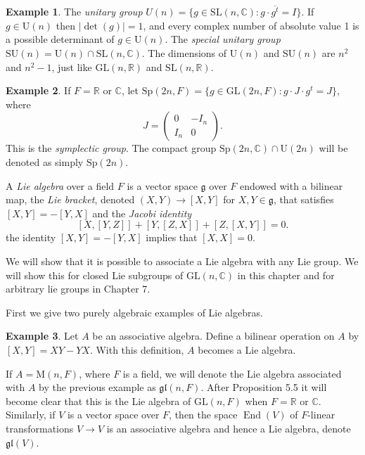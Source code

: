 \documentclass[12pt,reqno]{book}%
\theoremstyle{definition}
\newtheorem{example}{Example}[chapter]
\theoremstyle{remark}
\theoremstyle{theorem}
\theoremstyle{remark}
\DeclareMathOperator{\End}{End}
\begin{document}
\begin{example}\label{}
    The \emph{unitary group} $U(n) = \{g \in \mathrm{SL}(n, \mathbb{C}) : g \cdot \overline{g^t} = I\}$.
    If $g \in \mathrm{U}(n)$ then $|\det(g)| = 1$, and every complex number of absolute value 1 is a possible determinant of $g \in \mathrm{U}(n)$.
    The \emph{special unitary group} $\mathrm{SU}(n) = \mathrm{U}(n) \cap \mathrm{SL}(n, \mathbb{C})$.
    The dimensions of $\mathrm{U}(n)$ and $\mathrm{SU}(n)$ are $n^2$ and $n^2 - 1$, just like $\mathrm{GL}(n, \mathbb{R})$ and $\mathrm{SL}(n, \mathbb{R})$.
\end{example}

\begin{example}\label{}
    If $F = \mathbb{R}$ or $\mathbb{C}$, let $\mathrm{Sp}(2n, F) = \{g \in \mathrm{GL}(2n, F) : g \cdot J \cdot g^t = J\}$, where
    \[
        J = \begin{pmatrix}
            0   & -I_n  \\
            I_n & 0
        \end{pmatrix}
        .
    \]
    This is the \emph{symplectic group}.
    The compact group $\mathrm{Sp}(2n, \mathbb{C}) \cap \mathrm{U}(2n)$ will be denoted as simply $\mathrm{Sp}(2n)$.
\end{example}

A \emph{Lie algebra} over a field $F$ is a vector space $\mathfrak{g}$ over $F$ endowed with a bilinear map, the \emph{Lie bracket}, denoted $(X, Y) \to [X, Y]$ for $X, Y \in \mathfrak{g}$, that satisfies $[X, Y] = - [Y, X]$ and the \emph{Jacobi identity}
\begin{equation}\label{eqjacobiidentity}
    [X, [Y, Z]] + [Y, [Z, X]] + [Z, [X, Y]] = 0.
\end{equation}
the identity $[X, Y] = - [Y, X]$ implies that $[X, X] = 0$.

We will show that it is possible to associate a Lie algebra with any Lie group.
We will show this for closed Lie subgroups of $\mathrm{GL}(n, \mathbb{C})$ in this chapter and for arbitrary lie groups in Chapter 7.

First we give two purely algebraic examples of Lie algebras.

\begin{example}\label{}
    Let $A$ be an associative algebra.
    Define a bilinear operation on $A$ by $[X, Y] = XY - YX$.
    With this definition, $A$ becomes a Lie algebra.

    If $A = \mathrm{M}(n,F)$, where $F$ is a field, we will denote the Lie algebra associated with $A$ by the previous example as $\mathfrak{gl}(n,F)$.
    After Proposition 5.5 it will become clear that this is the Lie algebra of $\mathrm{GL}(n,F)$ when $F = \mathbb{R}$ or $\mathbb{C}$.
    Similarly, if $V$ is a vector space over $F$, then the space $\End(V)$ of $F$-linear transformations $V \to V$ is an associative algebra and hence a Lie algebra, denote $\mathfrak{gl}(V)$.
\end{example}
\end{document}
